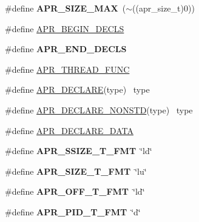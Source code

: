 \begin{DoxyCompactItemize}
\item 
\#define {\bfseries A\+P\+R\+\_\+\+S\+I\+Z\+E\+\_\+\+M\+AX}~($\sim$((apr\+\_\+size\+\_\+t)0))\hypertarget{group__apr__platform_gab5865d64b134a3924014837dd44627a7}{}\label{group__apr__platform_gab5865d64b134a3924014837dd44627a7}

\item 
\#define \hyperlink{group__apr__platform_gaa046c9c51a1af394db3a34dec1972630}{A\+P\+R\+\_\+\+B\+E\+G\+I\+N\+\_\+\+D\+E\+C\+LS}
\item 
\#define {\bfseries A\+P\+R\+\_\+\+E\+N\+D\+\_\+\+D\+E\+C\+LS}\hypertarget{group__apr__platform_ga32d22bd9e118350c750a9c9c05bdeef8}{}\label{group__apr__platform_ga32d22bd9e118350c750a9c9c05bdeef8}

\item 
\#define \hyperlink{group__apr__platform_gade8f829f9bd98fd4386894acf72edd7c}{A\+P\+R\+\_\+\+T\+H\+R\+E\+A\+D\+\_\+\+F\+U\+NC}
\item 
\#define \hyperlink{group__apr__platform_ga51bb2fd47cdff20cd9cb91d82e9b0efa}{A\+P\+R\+\_\+\+D\+E\+C\+L\+A\+RE}(type)                    ~type
\item 
\#define \hyperlink{group__apr__platform_gae3c44c6cd5ce0c984cd60de588506872}{A\+P\+R\+\_\+\+D\+E\+C\+L\+A\+R\+E\+\_\+\+N\+O\+N\+S\+TD}(type)      ~type
\item 
\#define \hyperlink{group__apr__platform_ga16a1a3d65c57ce052fffb63190b1cadc}{A\+P\+R\+\_\+\+D\+E\+C\+L\+A\+R\+E\+\_\+\+D\+A\+TA}
\item 
\#define {\bfseries A\+P\+R\+\_\+\+S\+S\+I\+Z\+E\+\_\+\+T\+\_\+\+F\+MT}~\char`\"{}ld\char`\"{}\hypertarget{group__apr__platform_gabac6108769f9b7deded82e73f3cd4060}{}\label{group__apr__platform_gabac6108769f9b7deded82e73f3cd4060}

\item 
\#define {\bfseries A\+P\+R\+\_\+\+S\+I\+Z\+E\+\_\+\+T\+\_\+\+F\+MT}~\char`\"{}lu\char`\"{}\hypertarget{group__apr__platform_ga86928aa34fa77f8e7855d69050e3a27a}{}\label{group__apr__platform_ga86928aa34fa77f8e7855d69050e3a27a}

\item 
\#define {\bfseries A\+P\+R\+\_\+\+O\+F\+F\+\_\+\+T\+\_\+\+F\+MT}~\char`\"{}ld\char`\"{}\hypertarget{group__apr__platform_gad71d0d5a325d1aedeb6328d6bdacac76}{}\label{group__apr__platform_gad71d0d5a325d1aedeb6328d6bdacac76}

\item 
\#define {\bfseries A\+P\+R\+\_\+\+P\+I\+D\+\_\+\+T\+\_\+\+F\+MT}~\char`\"{}d\char`\"{}\hypertarget{group__apr__platform_ga6c8e5aeab20eeaed373e3dd65cd33689}{}\label{group__apr__platform_ga6c8e5aeab20eeaed373e3dd65cd33689}


\end{DoxyCompactItemize}

